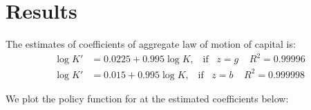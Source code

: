 \documentclass[12pt]{article}
\begin{document}
\section{Results}
The estimates of coefficients of aggregate law of motion of capital is:
\begin{align*}
\log K' & = 0.0225 + 0.995 \log K, \; \; \; \text{if} \; \; \; z = g  \; \; \; \; R^2 = 0.99996 \\
\log K' & = 0.015 + 0.995 \log K, \; \; \; \text{if} \; \; \; z = b \; \; \; \; R^2 = 0.999998
\end{align*}

We plot the policy function for at the estimated coefficients below:
\end{document}
